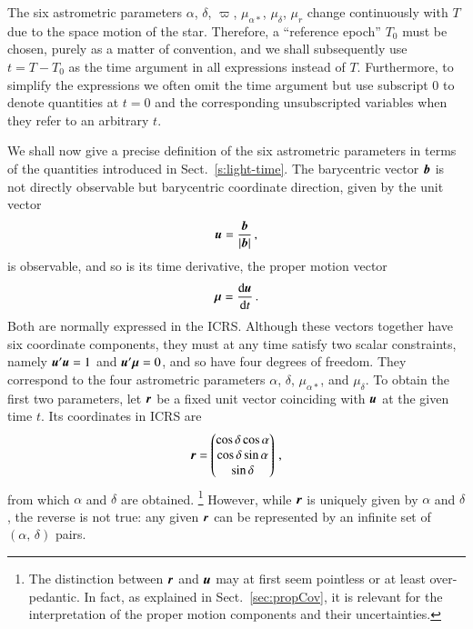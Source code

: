 \documentclass{aa}
\def\vec#1{\ensuremath{\mathchoice{\mbox{\boldmath$\displaystyle#1$}}
{\mbox{\boldmath$\textstyle#1$}}
{\mbox{\boldmath$\scriptstyle#1$}}
{\mbox{\boldmath$\scriptscriptstyle#1$}}}}
\begin{document}
The six astrometric parameters $\alpha$, $\delta$, $\varpi$, $\mu_{\alpha*}$, $\mu_\delta$,
$\mu_r$ change continuously with $T$ due to the space motion of the star.
Therefore, a ``reference epoch'' $T_0$ must be chosen, purely as a matter of convention, and
we shall subsequently use $t=T-T_0$ as the time argument in all expressions instead of $T$.
Furthermore, to simplify the expressions we often omit the time argument but use subscript 0
to denote quantities at $t=0$ and the corresponding unsubscripted variables when they refer
to an arbitrary $t$.

We shall now give a precise definition of the six astrometric parameters in terms of the quantities
introduced in Sect.~\ref{s:light-time}. The barycentric vector $\vec{b}$ is not directly
observable but barycentric coordinate direction, given by the unit vector
\begin{equation}\label{eq:u}
\vec{u} = \frac{\vec{b}}{\left| \vec{b} \right|} \, ,
\end{equation}
is observable, and so is its time derivative, the proper motion vector
\begin{equation}\label{eq:mu}
\vec{\mu} = \frac{\mathrm{d}\vec{u}}{\mathrm{d}t} \, .
\end{equation}
Both are normally expressed in the ICRS. Although these vectors together have six coordinate
components, they must at any time satisfy two scalar constraints, namely $\vec{u}'\vec{u}=1$
and $\vec{u}'\vec{\mu}=0$, and so have four degrees of freedom. They correspond to the four
astrometric parameters $\alpha$, $\delta$, $\mu_{\alpha*}$, and $\mu_\delta$. To obtain
the first two parameters, let $\vec{r}$ be a fixed unit vector coinciding with $\vec{u}$
at the given time $t$. Its coordinates in ICRS are
\begin{equation}\label{eq:r}
\vec{r}=
\begin{pmatrix}
\cos\delta\cos\alpha \\
\cos\delta\sin\alpha \\
\sin\delta
\end{pmatrix}\, ,
\end{equation}
from which $\alpha$ and $\delta$ are obtained.%
\footnote{The distinction between $\vec{r}$ and $\vec{u}$ may at first seem pointless or at
least over-pedantic. In fact, as explained in Sect.~\ref{sec:propCov}, it is relevant for the
interpretation of the proper motion components and their uncertainties.\label{fn:ru}}
However, while $\vec{r}$ is uniquely given by $\alpha$ and $\delta$, the reverse is not true:
any given $\vec{r}$ can be represented by an infinite set of $(\alpha,\,\delta)$ pairs.
\end{document}
